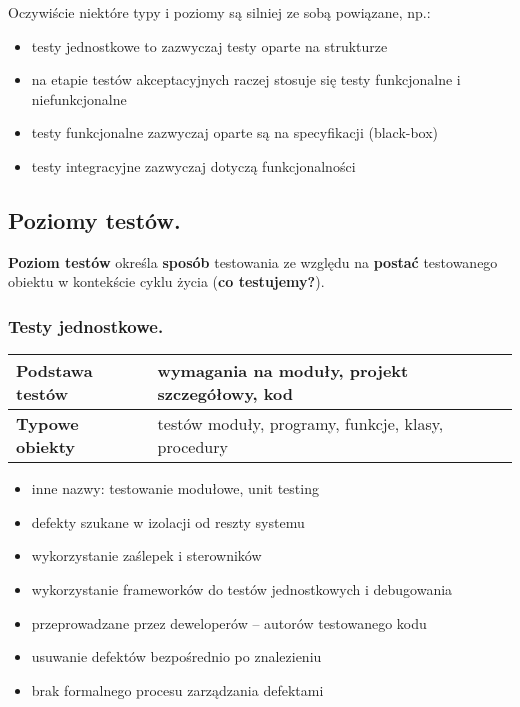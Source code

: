 \documentclass[../main.tex]{subfiles}
\begin{document}
    Oczywiście niektóre typy i poziomy są silniej ze sobą powiązane, np.:
    \begin{itemize}
        \item testy jednostkowe to zazwyczaj testy oparte na strukturze
        \item na etapie testów akceptacyjnych raczej stosuje się testy
        funkcjonalne i niefunkcjonalne
        \item testy funkcjonalne zazwyczaj oparte są na specyfikacji (black-box)
        \item testy integracyjne zazwyczaj dotyczą funkcjonalności
    \end{itemize}


    \subsection{Poziomy testów.}

    \textbf{Poziom testów} określa \textbf{sposób} testowania ze względu na \textbf{postać}
    testowanego obiektu w kontekście cyklu życia (\textbf{co testujemy?}).

    \subsubsection{Testy jednostkowe.}
    \begin{tabular}{|p{3cm}|p{13cm}|}
        \hline
        \textbf{Podstawa testów} & wymagania na moduły, projekt szczegółowy, kod\\
        \hline
        \textbf{Typowe obiekty} & testów moduły, programy, funkcje, klasy, procedury\\
        \hline
    \end{tabular}

    \begin{itemize}
        \item inne nazwy: testowanie modułowe, unit testing
        \item defekty szukane w izolacji od reszty systemu
        \item wykorzystanie zaślepek i sterowników
        \item wykorzystanie frameworków do testów jednostkowych i debugowania
        \item przeprowadzane przez deweloperów – autorów testowanego kodu
        \item usuwanie defektów bezpośrednio po znalezieniu
        \item brak formalnego procesu zarządzania defektami
    \end{itemize}
\end{document}
